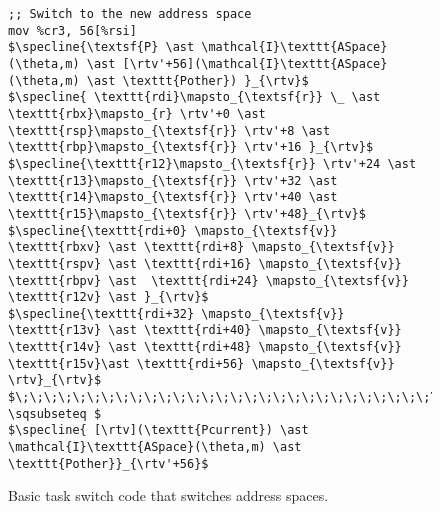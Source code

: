 \begin{figure}
\begin{lstlisting}
;; Switch to the new address space
mov %cr3, 56[%rsi]
$\specline{\textsf{P} \ast \mathcal{I}\texttt{ASpace}(\theta,m) \ast [\rtv'+56](\mathcal{I}\texttt{ASpace}(\theta,m) \ast \texttt{Pother}) }_{\rtv}$
$\specline{ \texttt{rdi}\mapsto_{\textsf{r}} \_ \ast \texttt{rbx}\mapsto_{r} \rtv'+0 \ast  \texttt{rsp}\mapsto_{\textsf{r}} \rtv'+8 \ast \texttt{rbp}\mapsto_{\textsf{r}} \rtv'+16 }_{\rtv}$
$\specline{\texttt{r12}\mapsto_{\textsf{r}} \rtv'+24 \ast \texttt{r13}\mapsto_{\textsf{r}} \rtv'+32 \ast \texttt{r14}\mapsto_{\textsf{r}} \rtv'+40 \ast \texttt{r15}\mapsto_{\textsf{r}} \rtv'+48}_{\rtv}$
$\specline{\texttt{rdi+0} \mapsto_{\textsf{v}} \texttt{rbxv} \ast \texttt{rdi+8} \mapsto_{\textsf{v}} \texttt{rspv} \ast \texttt{rdi+16} \mapsto_{\textsf{v}} \texttt{rbpv} \ast  \texttt{rdi+24} \mapsto_{\textsf{v}} \texttt{r12v} \ast }_{\rtv}$
$\specline{\texttt{rdi+32} \mapsto_{\textsf{v}} \texttt{r13v} \ast \texttt{rdi+40} \mapsto_{\textsf{v}} \texttt{r14v} \ast \texttt{rdi+48} \mapsto_{\textsf{v}} \texttt{r15v}\ast \texttt{rdi+56} \mapsto_{\textsf{v}} \rtv}_{\rtv}$
$\;\;\;\;\;\;\;\;\;\;\;\;\;\;\;\;\;\;\;\;\;\;\;\;\;\;\;\;\;\;\;\;\;\;\;\;\;\;\;\;\;\;\;\; \sqsubseteq $
$\specline{ [\rtv](\texttt{Pcurrent}) \ast \mathcal{I}\texttt{ASpace}(\theta,m) \ast \texttt{Pother}}_{\rtv'+56}$
\end{lstlisting}
\caption{Basic task switch code that switches address spaces.}
\label{fig:swtch}
\end{figure}

